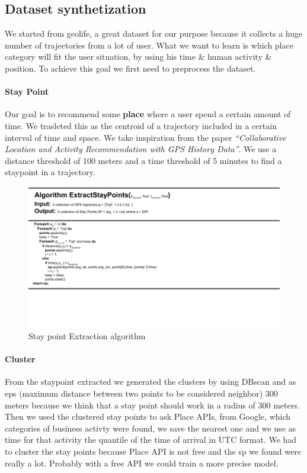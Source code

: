 \documentclass[../../main]{subfiles}
\begin{document}

\subsection{Dataset synthetization}
\label{ss:dataset-synthetization}

We started from geolife, a great dataset for our purpose because it collects a huge number of trajectories from a lot of user. What we want to learn is which place category will fit the user situation, by using his time \& human activity \& position.
To achieve this goal we first need to preprocess the dataset.

\paragraph{Stay Point}
Our goal is to recommend some \textbf{place} where a user spend a certain amount of time. We trasleted this as the centroid
of a trajectory included in a certain interval of time and space. We take inspiration from the paper 
\textit{``Collaborative Location and Activity Recommendation with GPS History Data''}. 
We use a distance threshold of 100 meters and a time threshold of 5 minutes to find a staypoint in a trajectory.
\begin{figure}[h]
    \centering
    \includegraphics{images/sp.png}
    \caption{Stay point Extraction algorithm}\label{fig:extraction_sp}
\end{figure}

\paragraph{Cluster}
From the staypoint extracted we generated the clusters by using DBscan and as eps (maximum distance between two points to be considered neighbor) 
300 meters because we think that a stay point should work in a radius of 300 meters. Then we used the clustered stay points to ask Place APIs, from Google, 
which categories of business activty were found, we save the nearest one and we use as time for that activity the quantile of the time of arrival in UTC format.
We had to cluster the stay points because Place API is not free and the sp we found were really a lot. Probably with a free API we could train a more precise model.
\end{document}
